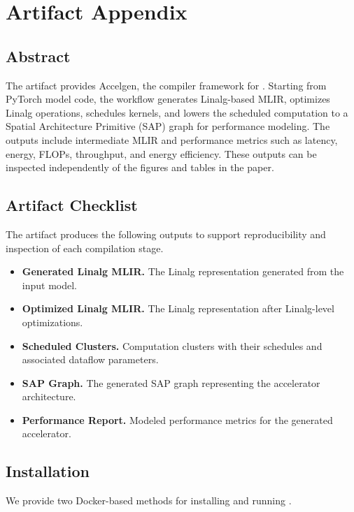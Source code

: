 \section{Artifact Appendix}
\label{app:artifact}

\subsection{Abstract}

The artifact provides Accelgen, the compiler framework for \name{}. Starting
from PyTorch model code, the workflow generates Linalg-based MLIR, optimizes
Linalg operations, schedules kernels, and lowers the scheduled computation to
a Spatial Architecture Primitive (SAP) graph for performance modeling. The
outputs include intermediate MLIR and performance metrics such as latency,
energy, FLOPs, throughput, and energy efficiency. These outputs can be
inspected independently of the figures and tables in the paper.

\subsection{Artifact Checklist}

The artifact produces the following outputs to support reproducibility and
inspection of each compilation stage.
\begin{itemize}[leftmargin=2em,itemsep=0.25em]
  \item \textbf{Generated Linalg MLIR.} The Linalg representation generated
    from the input model.
  \item \textbf{Optimized Linalg MLIR.} The Linalg representation after
    Linalg-level optimizations.
  \item \textbf{Scheduled Clusters.} Computation clusters with their schedules
    and associated dataflow parameters.
  \item \textbf{SAP Graph.} The generated SAP graph representing the
    accelerator architecture.
  \item \textbf{Performance Report.} Modeled performance metrics for the
    generated accelerator.
\end{itemize}

\subsection{Installation}

We provide two Docker-based methods for installing and running \name{}.

